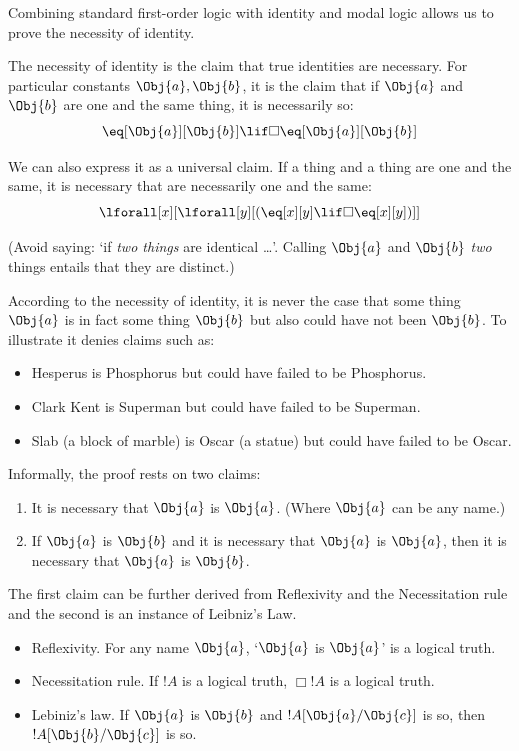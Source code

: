 \documentclass[../../../include/open-logic-section]{subfiles}
\begin{document}


Combining standard first-order logic with identity and modal logic 
allows us to prove the necessity of identity. 

\begin{defn}
The necessity of identity is the claim that true identities are 
necessary. For particular constants $\Obj{a},\Obj{b}$, it is the claim that 
if $\Obj{a}$ and $\Obj{b}$ are one and the same thing, it is necessarily so:
$$\eq[\Obj{a}][\Obj{b}]\lif\Box\eq[\Obj{a}][\Obj{b}]$$ 

We can also express it as a universal claim. If a thing and a thing
are one and the same, it is necessary that  are necessarily one and
the same: 
$$\lforall[x][\lforall[y][(\eq[x][y]\lif\Box\eq[x][y])]]$$
\end{defn}

(Avoid saying: `if \emph{two things} are identical \dots'. Calling $\Obj{a}$
 and $\Obj{b}$ \emph{two} things entails that they are distinct.)

According to the necessity of identity, it is never the case that 
some thing $\Obj{a}$ is in fact some thing $\Obj{b}$ but also 
could have not been $\Obj{b}$. To illustrate it denies claims such as:
\begin{itemize}
\item Hesperus is Phosphorus but could have failed to be Phosphorus.
\item Clark Kent is Superman but could have failed to be Superman.
\item Slab (a block of marble) is Oscar (a statue) but could have 
failed to be Oscar. 
\end{itemize} 

Informally, the proof rests on two claims:
\begin{enumerate}
    \item It is necessary that $\Obj{a}$ is $\Obj{a}$. (Where $\Obj{a}$ can be any name.)
    \item If $\Obj{a}$ is $\Obj{b}$ and it is necessary that $\Obj{a}$ is $\Obj{a}$, then it 
    is necessary that $\Obj{a}$ is $\Obj{b}$.
\end{enumerate}
The first claim can be further derived from Reflexivity and the
Necessitation rule and the second is an instance of Leibniz's Law.
\begin{itemize}
    \item Reflexivity. For any name $\Obj{a}$, `$\Obj{a}$ is $\Obj{a}$' is a logical truth.
    \item Necessitation rule. If $!A$ is a logical truth, $\Box!A$ is
    a logical truth.
    \item Lebiniz's law. If $\Obj{a}$ is $\Obj{b}$ and $!A[\Obj{a}/\Obj{c}]$ is so, then 
    $!A[\Obj{b}/\Obj{c}]$ is so.
\end{itemize}
\end{document}
